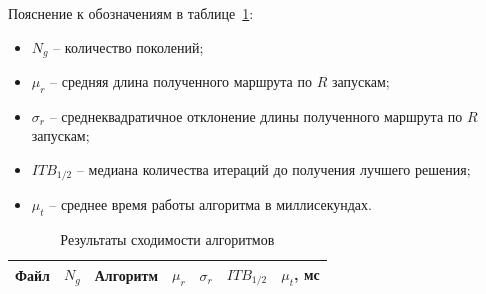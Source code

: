 Пояснение к обозначениям в таблице~\ref{tbl:convergence}:
\begin{itemize}
	\item $N_g$ -- количество поколений;
	\item $\mu_r$ -- средняя длина полученного маршрута по $R$ запускам;
	\item $\sigma_r$ -- среднеквадратичное отклонение длины полученного маршрута по $R$ запускам;
	\item $ITB_{1/2}$ -- медиана количества итераций до получения лучшего решения;
	\item $\mu_{t}$ -- среднее время работы алгоритма в миллисекундах.
\end{itemize}

\begin{longtable}{|p{}|p{}|p{}|p{}|p{}|p{}|p{}|}
	\caption{Результаты сходимости алгоритмов}\label{tbl:convergence} \\
	\hline
	\textbf{Файл} & $N_g$ & \textbf{Алгоритм} &  $\mu_r$ & $\sigma_r$ & $ITB_{1/2}$ & $\mu_{t}$, мс \\
	\hline
	\endfirsthead
	

\end{longtable}
